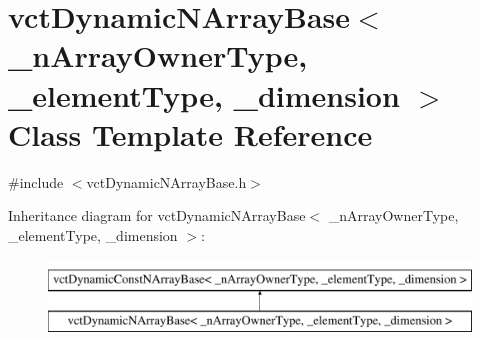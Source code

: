 \hypertarget{classvct_dynamic_n_array_base}{}\section{vct\+Dynamic\+N\+Array\+Base$<$ \+\_\+n\+Array\+Owner\+Type, \+\_\+element\+Type, \+\_\+dimension $>$ Class Template Reference}
\label{classvct_dynamic_n_array_base}


{\ttfamily \#include $<$vct\+Dynamic\+N\+Array\+Base.\+h$>$}

Inheritance diagram for vct\+Dynamic\+N\+Array\+Base$<$ \+\_\+n\+Array\+Owner\+Type, \+\_\+element\+Type, \+\_\+dimension $>$\+:\begin{figure}[H]
\begin{center}
\leavevmode
\includegraphics[height=2.000000cm]{da/dfb/classvct_dynamic_n_array_base}
\end{center}
\end{figure}

